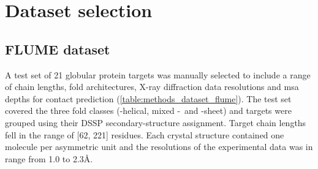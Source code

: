 
\section{Dataset selection}
\subsection{FLUME dataset} \label{sec:methods_dataset_flume}
A test set of 21 globular protein targets was manually selected to include a range of chain lengths, fold architectures, X-ray diffraction data resolutions and \gls{msa} depths for contact prediction  (\cref{table:methods_dataset_flume}). The test set covered the three fold classes (\textalpha-helical, mixed \textalpha-\textbeta\ and \textbeta-sheet) and targets were grouped using their DSSP \cite{Kabsch1983-dy} secondary-structure assignment. Target chain lengths fell in the range of [62, 221] residues. Each crystal structure contained one molecule per asymmetric unit and the resolutions of the experimental data was in range from 1.0 to 2.3\AA.

